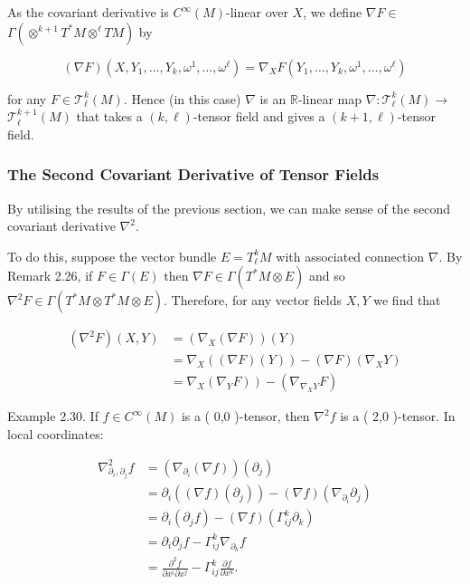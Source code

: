 \documentclass[10pt, letterpaper]{article}
\begin{document}
As the covariant derivative is $C^{\infty}(M)$-linear over $X$, we define $\nabla F \in$ $\Gamma\left(\otimes^{k+1} T^{*} M \otimes^{\ell} T M\right)$ by

$$
(\nabla F)\left(X, Y_{1}, \ldots, Y_{k}, \omega^{1}, \ldots, \omega^{\ell}\right)=\nabla_{X} F\left(Y_{1}, \ldots, Y_{k}, \omega^{1}, \ldots, \omega^{\ell}\right)
$$

for any $F \in \mathscr{T}_{\ell}^{k}(M)$. Hence (in this case) $\nabla$ is an $\mathbb{R}$-linear map $\nabla: \mathscr{T}_{\ell}^{k}(M) \rightarrow$ $\mathscr{T}_{\ell}^{k+1}(M)$ that takes a $(k, \ell)$-tensor field and gives a $(k+1, \ell)$-tensor field.

\subsubsection*{The Second Covariant Derivative of Tensor Fields}
By utilising the results of the previous section, we can make sense of the second covariant derivative $\nabla^{2}$.

To do this, suppose the vector bundle $E=T_{\ell}^{k} M$ with associated connection $\nabla$. By Remark 2.26, if $F \in \Gamma(E)$ then $\nabla F \in \Gamma\left(T^{*} M \otimes E\right)$ and so $\nabla^{2} F \in \Gamma\left(T^{*} M \otimes T^{*} M \otimes E\right)$. Therefore, for any vector fields $X, Y$ we find that

$$
\begin{aligned}
\left(\nabla^{2} F\right)(X, Y) & =\left(\nabla_{X}(\nabla F)\right)(Y) \\
& =\nabla_{X}((\nabla F)(Y))-(\nabla F)\left(\nabla_{X} Y\right) \\
& \left.=\nabla_{X}\left(\nabla_{Y} F\right)\right)-\left(\nabla_{\nabla_{X} Y} F\right)
\end{aligned}
$$

Example 2.30. If $f \in C^{\infty}(M)$ is a ( 0,0 )-tensor, then $\nabla^{2} f$ is a ( 2,0 )-tensor. In local coordinates:

$$
\begin{aligned}
\nabla_{\partial_{i}, \partial_{j}}^{2} f & =\left(\nabla_{\partial_{i}}(\nabla f)\right)\left(\partial_{j}\right) \\
& =\partial_{i}\left((\nabla f)\left(\partial_{j}\right)\right)-(\nabla f)\left(\nabla_{\partial_{i}} \partial_{j}\right) \\
& =\partial_{i}\left(\partial_{j} f\right)-(\nabla f)\left(\Gamma_{i j}^{k} \partial_{k}\right) \\
& =\partial_{i} \partial_{j} f-\Gamma_{i j}^{k} \nabla_{\partial_{k}} f \\
& =\frac{\partial^{2} f}{\partial x^{i} \partial x^{j}}-\Gamma_{i j}^{k} \frac{\partial f}{\partial x^{k}} .
\end{aligned}
$$
\end{document}
